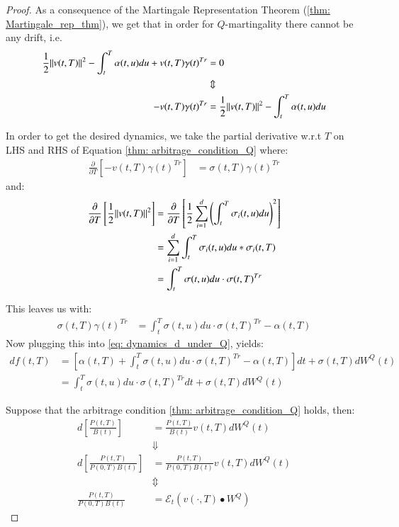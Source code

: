 \begin{proof}
As a consequence of the Martingale Representation Theorem (\ref{thm: Martingale_rep_thm}), we get that in order for $Q$-martingality there cannot be any drift, i.e. 
\begin{align*}
\frac{1}{2}\norm{v(t,T)}^{2} - \int_{t}^{T}\alpha(t,u)du
+ v(t,T)\gamma(t)^{Tr} 
&= 0 \\ 
&\Updownarrow \\ 
-v(t,T)\gamma(t)^{Tr}
&= 
\frac{1}{2}\norm{v(t,T)}^{2} - \int_{t}^{T}\alpha(t,u)du
\end{align*}

\newpage 

In order to get the desired dynamics, we take the partial derivative w.r.t $T$ on LHS and RHS of Equation \ref{thm: arbitrage_condition_Q} where:
\begin{align*}
\frac{\partial}{\partial T}\left[
-v(t,T)\gamma(t)^{Tr}
\right]
&= 
\sigma(t,T)\gamma(t)^{Tr}
\end{align*}
and:
\begin{align*}
\frac{\partial}{\partial T}\left[
\frac{1}{2}\norm{
v(t,T)
}^{2} 
\right]
&= 
\frac{\partial}{\partial T}\left[
\frac{1}{2}\sum_{i=1}^{d}\left(
\int_{t}^{T}\sigma_{i}(t,u)du
\right)^{2}
\right] \\ 
&= \sum_{i=1}^{d}\int_{t}^{T}\sigma_{i}(t,u)du*\sigma_{i}(t,T) \\ 
&= \int_{t}^{T}\sigma(t,u)du\cdot \sigma(t,T)^{Tr}    
\end{align*}

This leaves us with: 
\begin{align*}
\sigma(t,T)\gamma(t)^{Tr} &= 
\int_{t}^{T}\sigma(t,u)du\cdot \sigma(t,T)^{Tr} 
- \alpha(t,T)    
\end{align*}
Now plugging this into \ref{eq: dynamics_d_under_Q}, yields: 
\begin{align*}
df(t,T) &= \left[
\alpha(t,T) + \int_{t}^{T}\sigma(t,u)du\cdot \sigma(t,T)^{Tr} 
- \alpha(t,T)
\right]dt 
+ \sigma(t,T)dW^{Q}(t) \\ 
&= 
\int_{t}^{T}\sigma(t,u)du\cdot \sigma(t,T)^{Tr}
dt 
+ \sigma(t,T)dW^{Q}(t)
\end{align*}

Suppose that the arbitrage condition \ref{thm: arbitrage_condition_Q} holds, then: 
\begin{align*}
d\left[
\frac{P(t,T)}{B(t)}
\right]
&= 
\frac{P(t,T)}{B(t)}v(t,T)dW^{Q}(t) \\ 
&\Downarrow \\ 
d\left[
\frac{P(t,T)}{P(0,T)B(t)}
\right] 
&= 
\frac{P(t,T)}{P(0,T)B(t)}v(t,T)dW^{Q}(t) \\ 
&\Updownarrow \\ 
\frac{P(t,T)}{P(0,T)B(t)} &= \mathcal{E}_{t}(v(\cdot, T)\bullet W^{Q})
\end{align*}
\end{proof}

